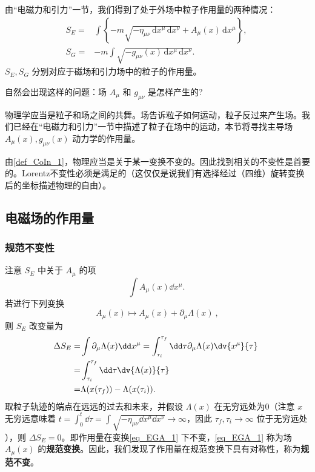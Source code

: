 

\cite{AZee}由“电磁力和引力”一节，我们得到了处于外场中粒子作用量的两种情况：
\begin{equation}
\begin{aligned}
S_E=&\int \left\{-m\sqrt{-\eta_{\mu\nu} \,\mathrm{d}{x} ^\mu \,\mathrm{d}{x} ^\nu}+A_\mu(x) \,\mathrm{d}{x} ^\mu \right\} ,\\
S_G=&-m\int\sqrt{-g_{\mu\nu}(x) \,\mathrm{d}{x} ^\mu \,\mathrm{d}{x} ^\nu}.
\end{aligned}~
\end{equation}
 $S_E,S_G$ 分别对应于磁场和引力场中的粒子的作用量。

自然会出现这样的问题：场 $A_\mu$ 和 $g_{\mu\nu}$ 是怎样产生的?

物理学应当是粒子和场之间的共舞。场告诉粒子如何运动，粒子反过来产生场。我们已经在“电磁力和引力”一节中描述了粒子在场中的运动，本节将寻找主导场 $A_\mu(x),g_{\mu\nu}(x)$ 动力学的作用量。

由\autoref{def_CoIn_1}，物理应当是关于某一变换不变的。因此找到相关的不变性是首要的。Lorentz不变性必须是满足的（这仅仅是说我们有选择经过（四维）旋转变换后的坐标描述物理的自由）。


\subsection{电磁场的作用量}
\subsubsection{规范不变性}
注意 $S_E$ 中关于 $A_\mu$ 的项
\begin{equation}
\int A_\mu(x) \dd x^\mu.~ 
\end{equation}
若进行下列变换
\begin{equation}\label{eq_EGA_1}
A_\mu(x)\mapsto A_\mu(x)+\partial_\mu\Lambda(x)~,
\end{equation}
则 $S_E$ 改变量为
\begin{equation}
\begin{aligned}
\Delta S_E=&\int\partial_\mu\Lambda(x)\dd x^\mu=\int_{\tau_i}^{\tau_f}\dd \tau\partial_\mu\Lambda(x)\dv{x^\mu}{\tau}\\
=&\int_{\tau_i}^{\tau_f}\dd\tau\dv{\Lambda(x)}{\tau}\\
=&\Lambda(x(\tau_f))-\Lambda(x(\tau_i)).
\end{aligned}~
\end{equation}
取粒子轨迹的端点在远远的过去和未来，并假设 $\Lambda(x)$ 在无穷远处为0（注意 $x$ 无穷远意味着 $t=\int_0^t\dd\tau=\int\sqrt{-\eta_{\mu\nu}\dd x^\mu \dd x^\nu}\rightarrow\infty$，因此 $\tau_f,\tau_i\rightarrow\infty$ 位于无穷远处 ），则 $\Delta S_E=0$。即作用量在变换\autoref{eq_EGA_1} 下不变，\autoref{eq_EGA_1} 称为场 $A_\mu(x)$ 的\textbf{规范变换}。因此，我们发现了作用量在规范变换下具有对称性，称为\textbf{规范不变}。


